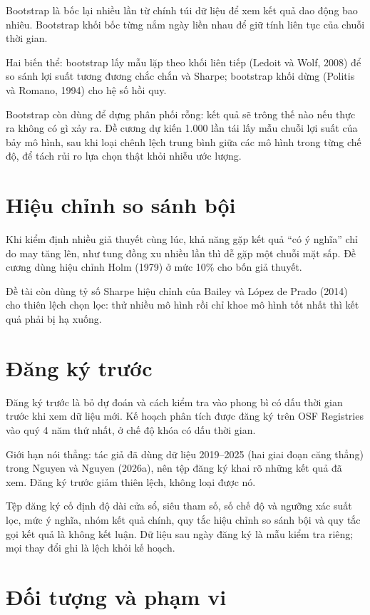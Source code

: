 Bootstrap là bốc lại nhiều lần từ chính túi dữ liệu để xem kết quả dao động bao nhiêu. Bootstrap khối bốc từng nắm ngày liền nhau để giữ tính liên tục của chuỗi thời gian.

Hai biến thể: bootstrap lấy mẫu lặp theo khối liên tiếp (Ledoit và Wolf, 2008) để so sánh lợi suất tương đương chắc chắn và Sharpe; bootstrap khối dừng (Politis và Romano, 1994) cho hệ số hồi quy.

Bootstrap còn dùng để dựng phân phối rỗng: kết quả sẽ trông thế nào nếu thực ra không có gì xảy ra. Đề cương dự kiến 1.000 lần tái lấy mẫu chuỗi lợi suất của bảy mô hình, sau khi loại chênh lệch trung bình giữa các mô hình trong từng chế độ, để tách rủi ro lựa chọn thật khỏi nhiễu ước lượng.

\section{Hiệu chỉnh so sánh bội}

Khi kiểm định nhiều giả thuyết cùng lúc, khả năng gặp kết quả “có ý nghĩa” chỉ do may tăng lên, như tung đồng xu nhiều lần thì dễ gặp một chuỗi mặt sấp. Đề cương dùng hiệu chỉnh Holm (1979) ở mức 10\% cho bốn giả thuyết.

Đề tài còn dùng tỷ số Sharpe hiệu chỉnh của Bailey và López de Prado (2014) cho thiên lệch chọn lọc: thử nhiều mô hình rồi chỉ khoe mô hình tốt nhất thì kết quả phải bị hạ xuống.

\section{Đăng ký trước}

Đăng ký trước là bỏ dự đoán và cách kiểm tra vào phong bì có dấu thời gian trước khi xem dữ liệu mới. Kế hoạch phân tích được đăng ký trên OSF Registries vào quý 4 năm thứ nhất, ở chế độ khóa có dấu thời gian.

Giới hạn nói thẳng: tác giả đã dùng dữ liệu 2019--2025 (hai giai đoạn căng thẳng) trong Nguyen và Nguyen (2026a), nên tệp đăng ký khai rõ những kết quả đã xem. Đăng ký trước giảm thiên lệch, không loại được nó.

Tệp đăng ký cố định độ dài cửa sổ, siêu tham số, số chế độ và ngưỡng xác suất lọc, mức ý nghĩa, nhóm kết quả chính, quy tắc hiệu chỉnh so sánh bội và quy tắc gọi kết quả là không kết luận. Dữ liệu sau ngày đăng ký là mẫu kiểm tra riêng; mọi thay đổi ghi là lệch khỏi kế hoạch.

\section{Đối tượng và phạm vi}

